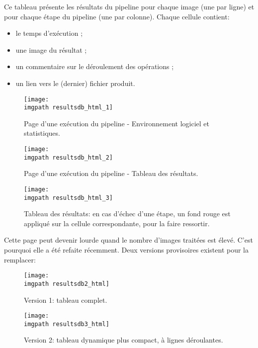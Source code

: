 Ce tableau présente les résultats du pipeline pour chaque image (une par ligne) et pour chaque étape du pipeline (une par colonne). Chaque cellule contient:

\begin{itemize}
 \item le temps d'exécution ;
 \item une image du résultat ;
 \item un commentaire sur le déroulement des opérations ;
 \item un lien vers le (dernier) fichier produit.
\end{itemize}

\begin{figure}[H]
\label{fig:resultsdb_html_1}
\begin{center}
  \texttt{[image: \\imgpath resultsdb\_html\_1]}
  \caption*{Page d'une exécution du pipeline - Environnement logiciel et statistiques.}
\end{center}
\end{figure}


\begin{figure}[H]
\label{fig:resultsdb_html_2}
\begin{center}
  \texttt{[image: \\imgpath resultsdb\_html\_2]}
  \caption*{Page d'une exécution du pipeline - Tableau des résultats.}
\end{center}
\end{figure}


\begin{figure}[H]
\label{fig:resultsdb_html_3}
\begin{center}
  \texttt{[image: \\imgpath resultsdb\_html\_3]}
  \caption*{Tableau des résultats: en cas d'échec d'une étape, un fond rouge est appliqué sur la cellule correspondante, pour la faire ressortir.}
\end{center}
\end{figure}

Cette page peut devenir lourde quand le nombre d'images traitées est élevé. C'est pourquoi elle a été refaite récemment. Deux versions provisoires existent pour la remplacer:

\begin{figure}[H]
\label{fig:resultsdb2_html}
\begin{center}
  \texttt{[image: \\imgpath resultsdb2\_html]}
  \caption*{Version 1: tableau complet.}
\end{center}
\end{figure}

\begin{figure}[H]
\label{fig:resultsdb3_html}
\begin{center}
  \texttt{[image: \\imgpath resultsdb3\_html]}
  \caption*{Version 2: tableau dynamique plus compact, à lignes déroulantes.}
\end{center}
\end{figure}

